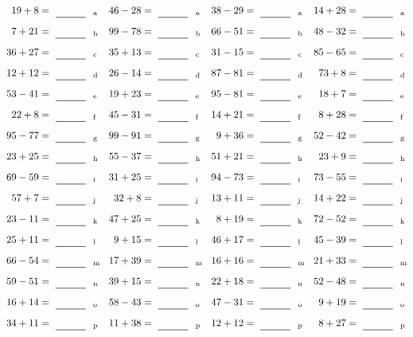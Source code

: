 \documentclass
[
  draft    = true,
  fontsize = 11pt,
  parskip  = half-
]
{scrartcl}
\begin{document}
\clearpage
\begin{align*}
    \pline{19+8}&=\rline{a}
  & \pline{46-28}&=\rline{a}
  & \pline{38-29}&=\rline{a}
  & \pline{14+28}&=\rline{a} \\[1ex]
    \pline{7+21}&=\rline{b}
  & \pline{99-78}&=\rline{b}
  & \pline{66-51}&=\rline{b}
  & \pline{48-32}&=\rline{b} \\[1ex]
    \pline{36+27}&=\rline{c}
  & \pline{35+13}&=\rline{c}
  & \pline{31-15}&=\rline{c}
  & \pline{85-65}&=\rline{c} \\[1ex]
    \pline{12+12}&=\rline{d}
  & \pline{26-14}&=\rline{d}
  & \pline{87-81}&=\rline{d}
  & \pline{73+8}&=\rline{d} \\[1ex]
    \pline{53-41}&=\rline{e}
  & \pline{19+23}&=\rline{e}
  & \pline{95-81}&=\rline{e}
  & \pline{18+7}&=\rline{e} \\[1ex]
    \pline{22+8}&=\rline{f}
  & \pline{45-31}&=\rline{f}
  & \pline{14+21}&=\rline{f}
  & \pline{8+28}&=\rline{f} \\[1ex]
    \pline{95-77}&=\rline{g}
  & \pline{99-91}&=\rline{g}
  & \pline{9+36}&=\rline{g}
  & \pline{52-42}&=\rline{g} \\[1ex]
    \pline{23+25}&=\rline{h}
  & \pline{55-37}&=\rline{h}
  & \pline{51+21}&=\rline{h}
  & \pline{23+9}&=\rline{h} \\[1ex]
    \pline{69-59}&=\rline{i}
  & \pline{31+25}&=\rline{i}
  & \pline{94-73}&=\rline{i}
  & \pline{73-55}&=\rline{i} \\[1ex]
    \pline{57+7}&=\rline{j}
  & \pline{32+8}&=\rline{j}
  & \pline{13+11}&=\rline{j}
  & \pline{14+22}&=\rline{j} \\[1ex]
    \pline{23-11}&=\rline{k}
  & \pline{47+25}&=\rline{k}
  & \pline{8+19}&=\rline{k}
  & \pline{72-52}&=\rline{k} \\[1ex]
    \pline{25+11}&=\rline{l}
  & \pline{9+15}&=\rline{l}
  & \pline{46+17}&=\rline{l}
  & \pline{45-39}&=\rline{l} \\[1ex]
    \pline{66-54}&=\rline{m}
  & \pline{17+39}&=\rline{m}
  & \pline{16+16}&=\rline{m}
  & \pline{21+33}&=\rline{m} \\[1ex]
    \pline{59-51}&=\rline{n}
  & \pline{39+15}&=\rline{n}
  & \pline{22+18}&=\rline{n}
  & \pline{52-48}&=\rline{n} \\[1ex]
    \pline{16+14}&=\rline{o}
  & \pline{58-43}&=\rline{o}
  & \pline{47-31}&=\rline{o}
  & \pline{9+19}&=\rline{o} \\[1ex]
    \pline{34+11}&=\rline{p}
  & \pline{11+38}&=\rline{p}
  & \pline{12+12}&=\rline{p}
  & \pline{8+27}&=\rline{p}
\end{align*}
\end{document}
